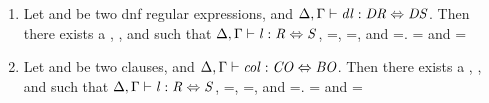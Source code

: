 \begin{lemma}\leavevmode
\begin{enumerate}
\item Let \DNFRegex{} and \DNFRegexAlt{} be two dnf regular expressions, and $\Delta, \Gamma \vdash \mathit{dl} : \mathit{DR} \Leftrightarrow \mathit{DS}$.  Then there exists a \Lens{}, \Regex{}, and \RegexAlt{} such that $\Delta, \Gamma \vdash \mathit{l} : \mathit{R} \Leftrightarrow \mathit{S}$, \PutRightOf{\Lens}=\PutRightOf{\DNFLens}, \LanguageOf{\Delta}{\Regex}=\LanguageOf{\Delta}{\DNFRegex}, and \LanguageOf{\Delta}{\RegexAlt}=\LanguageOf{\Delta}{\DNFRegexAlt}.  \LanguageOf{\Delta{}}{\Regex{}} = \LanguageOf{\Delta{}}{\DNFRegex{}} and
\LanguageOf{\Delta{}}{\RegexAlt{}} = \LanguageOf{\Delta{}}{\DNFRegexAlt{}}

\item Let \Conjunct{} and \ConjunctAlt{} be two clauses, and $\Delta, \Gamma \vdash \mathit{col} : \mathit{CO} \Leftrightarrow \mathit{BO}$.  Then there exists a \Lens{}, \Regex{}, and \RegexAlt{} such that $\Delta, \Gamma \vdash \mathit{l} : \mathit{R} \Leftrightarrow \mathit{S}$, \PutRightOf{\Lens}=\PutRightOf{\ConjunctLens}, \LanguageOf{\Delta}{\Regex}=\LanguageOf{\Delta}{\Conjunct}, and \LanguageOf{\Delta}{\RegexAlt}=\LanguageOf{\Delta}{\ConjunctAlt}.  \LanguageOf{\Delta{}}{\Regex{}} = \LanguageOf{\Delta{}}{\Conjunct{}} and
\LanguageOf{\Delta{}}{\RegexAlt{}} = \LanguageOf{\Delta{}}{\ConjunctAlt{}}


\end{enumerate}
\end{lemma}
